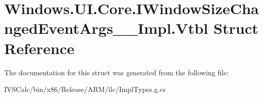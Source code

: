 \hypertarget{struct_windows_1_1_u_i_1_1_core_1_1_i_window_size_changed_event_args_____impl_1_1_vtbl}{}\section{Windows.\+U\+I.\+Core.\+I\+Window\+Size\+Changed\+Event\+Args\+\_\+\+\_\+\+Impl.\+Vtbl Struct Reference}
\label{struct_windows_1_1_u_i_1_1_core_1_1_i_window_size_changed_event_args_____impl_1_1_vtbl}


The documentation for this struct was generated from the following file\+:\begin{DoxyCompactItemize}
\item 
I\+V\+S\+Calc/bin/x86/\+Release/\+A\+R\+M/ilc/Impl\+Types.\+g.\+cs\end{DoxyCompactItemize}
